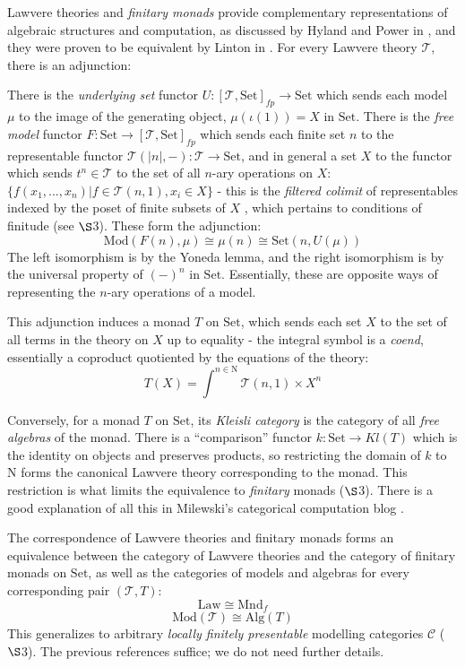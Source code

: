 \documentclass[a4paper,UKenglish]{article}
\theoremstyle{definition}
\def\ld{\rotatebox[origin=c]{-90}{$\dashv$}} %
\newcommand{\Set}{\mathrm{Set}}
\newcommand{\Alg}{\mathrm{Alg}}
\newcommand{\Mod}{\mathrm{Mod}}
\newcommand{\NN}{\mathrm{N}}
\newcommand{\C}{\mathscr{C}}
\newcommand{\T}{\mathscr{T}}
\begin{document}
Lawvere theories and \textit{finitary monads} provide complementary representations of algebraic structures and computation, as discussed by Hyland and Power in \cite{ltam}, and they were proven to be equivalent by Linton in \cite{linton}. For every Lawvere theory $\T$, there is an adjunction:

\begin{center}
\end{center}

There is the \textit{underlying set} functor $U:[\T,\Set]_{fp} \to \Set$ which sends each model $\mu$ to the image of the generating object, $\mu(\iota(1)) = X$ in $\Set$. There is the \textit{free model} functor $F:\Set \to [\T,\Set]_{fp}$ which sends each finite set $n$ to the representable functor $\T(|n|,-):\T \to \Set$, and in general a set $X$ to the functor which sends $t^n \in \T$ to the set of all $n$-ary operations on $X$: $\{f(x_1,...,x_n)|f\in \T(n,1), x_i\in X\}$ - this is the \textit{filtered colimit} of representables indexed by the poset of finite subsets of $X$ \cite{nlab}, which pertains to conditions of finitude (see $\S$3). These form the adjunction: $$\Mod(F(n),\mu) \cong \mu(n) \cong \Set(n,U(\mu))$$ The left isomorphism is by the Yoneda lemma, and the right isomorphism is by the universal property of $(-)^n$ in $\Set$. Essentially, these are opposite ways of representing the $n$-ary operations of a model.

This adjunction induces a monad $T$ on $\Set$, which sends each set $X$ to the set of all terms in the theory on $X$ up to equality - the integral symbol is a \textit{coend}, essentially a coproduct quotiented by the equations of the theory: $$T(X) = \int^{n\in \NN} \T(n,1) \times X^n$$

Conversely, for a monad $T$ on $\Set$, its \textit{Kleisli category} is the category of all \textit{free algebras} of the monad. There is a ``comparison'' functor $k: \Set \to Kl(T)$ which is the identity on objects and preserves products, so restricting the domain of $k$ to $\NN$ forms the canonical Lawvere theory corresponding to the monad. This restriction is what limits the equivalence to \textit{finitary} monads ($\S$3). There is a good explanation of all this in Milewski's categorical computation blog \cite{milew}.

The correspondence of Lawvere theories and finitary monads forms an equivalence between the category of Lawvere theories and the category of finitary monads on $\Set$, as well as the categories of models and algebras for every corresponding pair $(\T, T)$: $$\mathrm{Law} \cong \mathrm{Mnd}_f$$ $$\Mod(\T) \cong \Alg(T)$$ This generalizes to arbitrary \textit{locally finitely presentable} modelling categories $\C$ ($\S$3). The previous references suffice; we do not need further details. 
\end{document}
